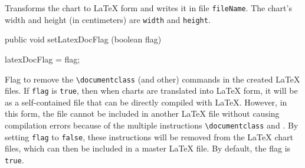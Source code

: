 \begin{tabb}
   Transforms the chart to \LaTeX{} form and writes it in file \texttt{fileName}.
   The chart's width and height (in centimeters) are \texttt{width} and \texttt{height}.
\end{tabb}
\begin{code}

   public void setLatexDocFlag (boolean flag) \begin{hide} {
      latexDocFlag = flag;
   }\end{hide}
\end{code}
\begin{tabb}
Flag to remove the \verb#\documentclass# (and other) commands in the
created \LaTeX{} files.
If \texttt{flag} is \texttt{true},  then when charts are translated into
\LaTeX{} form, it will be as a self-contained file that can be directly
compiled with \LaTeX{}. However, in this form, the file cannot be included in
another \LaTeX{} file without causing compilation errors because of the multiple
instructions \verb#\documentclass# and \verb##.
By setting \texttt{flag} to \texttt{false}, these instructions will be
removed from the \LaTeX{} chart files, which can then be included in a master
\LaTeX{} file. By default, the flag is \texttt{true}.
\end{tabb}
